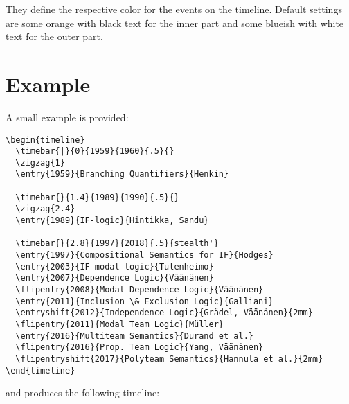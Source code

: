 \documentclass{article}
\begin{document}
They define the respective color for the events on the timeline.
Default settings are some orange  with black text for the inner part and some blueish  with white text for the outer part.

\section{Example}
A small example is provided:

\begin{verbatim}
\begin{timeline}
  \timebar{|}{0}{1959}{1960}{.5}{}
  \zigzag{1}
  \entry{1959}{Branching Quantifiers}{Henkin}
  
  \timebar{}{1.4}{1989}{1990}{.5}{}
  \zigzag{2.4}
  \entry{1989}{IF-logic}{Hintikka, Sandu}
  
  \timebar{}{2.8}{1997}{2018}{.5}{stealth'}
  \entry{1997}{Compositional Semantics for IF}{Hodges}
  \entry{2003}{IF modal logic}{Tulenheimo}
  \entry{2007}{Dependence Logic}{Väänänen}
  \flipentry{2008}{Modal Dependence Logic}{Väänänen}
  \entry{2011}{Inclusion \& Exclusion Logic}{Galliani}
  \entryshift{2012}{Independence Logic}{Grädel, Väänänen}{2mm}
  \flipentry{2011}{Modal Team Logic}{Müller}
  \entry{2016}{Multiteam Semantics}{Durand et al.}
  \flipentry{2016}{Prop. Team Logic}{Yang, Väänänen}
  \flipentryshift{2017}{Polyteam Semantics}{Hannula et al.}{2mm}
\end{timeline}
\end{verbatim}
and produces the following timeline:

	\begin{timeline}
	  	
	
  	\end{timeline}
\end{document}
